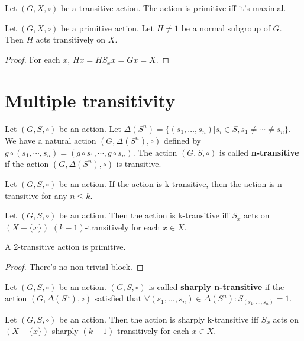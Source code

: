 \documentclass[12pt]{book}
\begin{document}
\begin{corollary}
	Let $(G,X,\circ)$ be a transitive action. The action is primitive iff it's maximal.
\end{corollary}

\begin{lemma}
	Let $(G,X,\circ)$ be a primitive action. Let $H\neq 1$ be a normal subgroup of $G$. Then $H$ acts transitively on $X$.
\end{lemma}
\begin{proof}
	For each $x$, $Hx=HS_xx=Gx=X$.
\end{proof}

\section{Multiple transitivity}

\begin{definition}
	Let $(G,S,\circ)$ be an action. Let $\Delta(S^n)=\{(s_1,\dots,s_n)|s_i\in S, s_1\neq\cdots\neq s_n\}$. We have a natural action $(G,\Delta(S^n),\circ)$ defined by $g\circ(s_1,\cdots,s_n)=(g\circ s_1,\cdots,g\circ s_n)$. The action $(G,S,\circ)$ is called {\bf n-transitive} if the action $(G,\Delta(S^n),\circ)$ is transitive.
\end{definition}

\begin{lemma}
	Let $(G,S,\circ)$ be an action. If the action is k-transitive, then the action is n-transitive for any $n\leq k$.
\end{lemma}

\begin{lemma}
	Let $(G,S,\circ)$ be an action. Then the action is k-transitive iff $S_x$ acts on $(X-\{x\})$ $(k-1)$-transitively for each $x\in X$.
\end{lemma}

\begin{lemma}
	A 2-transitive action is primitive.
\end{lemma}
\begin{proof}
	There's no non-trivial block.
\end{proof}

\begin{definition}
	Let $(G,S,\circ)$ be an action. $(G,S,\circ)$ is called {\bf sharply n-transitive} if the action $(G,\Delta(S^n),\circ)$ satisfied that $\forall(s_1,\dots,s_n)\in \Delta(S^n): S_{(s_1,\dots,s_n)}=1$. 
\end{definition}

\begin{lemma}
	Let $(G,S,\circ)$ be an action. Then the action is sharply k-transitive iff $S_x$ acts on $(X-\{x\})$ sharply $(k-1)$-transitively for each $x\in X$.
\end{lemma}
\end{document}

